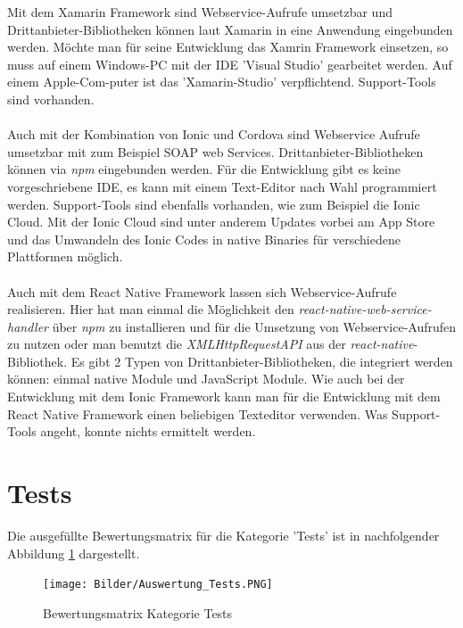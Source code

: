 Mit dem Xamarin Framework sind Webservice-Aufrufe umsetzbar und Drittanbieter-Bibliotheken können laut Xamarin in eine Anwendung eingebunden werden. Möchte man für seine Entwicklung das Xamrin Framework einsetzen, so muss auf einem Windows-PC mit der IDE 'Visual Studio' gearbeitet werden. Auf einem Apple-Com-puter ist das 'Xamarin-Studio' verpflichtend. Support-Tools sind vorhanden. 
\\
\\
Auch mit der Kombination von Ionic und Cordova sind Webservice Aufrufe umsetzbar mit zum Beispiel SOAP web Services. Drittanbieter-Bibliotheken können via \textit{npm} eingebunden werden. Für die Entwicklung gibt es keine vorgeschriebene IDE, es kann mit einem Text-Editor nach Wahl programmiert werden. Support-Tools sind ebenfalls vorhanden, wie zum Beispiel die Ionic Cloud. Mit der Ionic Cloud sind unter anderem Updates vorbei am App Store und das Umwandeln des Ionic Codes in native Binaries für verschiedene Plattformen möglich. 
\\
\\
Auch mit dem React Native Framework lassen sich Webservice-Aufrufe realisieren. Hier hat man einmal die Möglichkeit den \textit{react-native-web-service-handler} über \textit{npm} zu installieren und für die Umsetzung von Webservice-Aufrufen zu nutzen oder man benutzt die \textit{XMLHttpRequestAPI} aus der \textit{react-native}-Bibliothek. Es gibt 2 Typen von Drittanbieter-Bibliotheken, die integriert werden können: einmal native Module und JavaScript Module. Wie auch bei der Entwicklung mit dem Ionic Framework kann man für die Entwicklung mit dem React Native Framework einen beliebigen Texteditor verwenden. Was Support-Tools angeht, konnte nichts ermittelt werden.

\section{Tests}

Die ausgefüllte Bewertungsmatrix für die Kategorie 'Tests' ist in nachfolgender Abbildung \ref{fig:AuswTest} dargestellt.

\begin{figure}[h]
	\centering
	\texttt{[image: Bilder/Auswertung\_Tests.PNG]}
	\caption{Bewertungsmatrix Kategorie Tests}
	\label{fig:AuswTest}
\end{figure}

